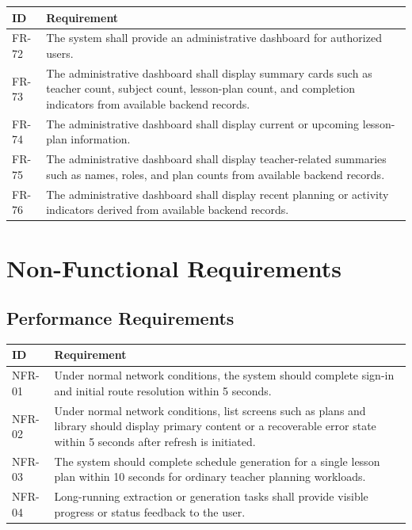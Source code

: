 \documentclass[12pt]{article}
\begin{document}
\begin{longtable}{|L{2.3cm}|L{11.3cm}|}
\hline
\textbf{ID} & \textbf{Requirement} \\
\hline
FR-72 & The system shall provide an administrative dashboard for authorized users. \\
\hline
FR-73 & The administrative dashboard shall display summary cards such as teacher count, subject count, lesson-plan count, and completion indicators from available backend records. \\
\hline
FR-74 & The administrative dashboard shall display current or upcoming lesson-plan information. \\
\hline
FR-75 & The administrative dashboard shall display teacher-related summaries such as names, roles, and plan counts from available backend records. \\
\hline
FR-76 & The administrative dashboard shall display recent planning or activity indicators derived from available backend records. \\
\hline
\end{longtable}

\section{Non-Functional Requirements}

\subsection{Performance Requirements}

\begin{longtable}{|L{2.3cm}|L{11.3cm}|}
\hline
\textbf{ID} & \textbf{Requirement} \\
\hline
NFR-01 & Under normal network conditions, the system should complete sign-in and initial route resolution within 5 seconds. \\
\hline
NFR-02 & Under normal network conditions, list screens such as plans and library should display primary content or a recoverable error state within 5 seconds after refresh is initiated. \\
\hline
NFR-03 & The system should complete schedule generation for a single lesson plan within 10 seconds for ordinary teacher planning workloads. \\
\hline
NFR-04 & Long-running extraction or generation tasks shall provide visible progress or status feedback to the user. \\
\hline
\end{longtable}
\end{document}
